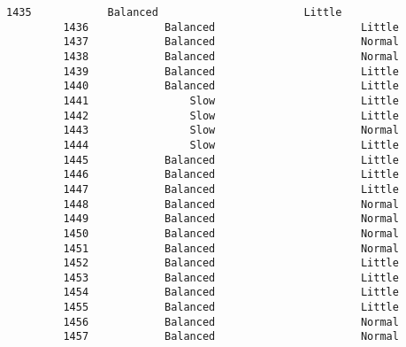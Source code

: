 \documentclass[11pt]{article}
\begin{document}
\begin{Verbatim}[commandchars=\\\{\}]
         1435            Balanced                       Little   
         1436            Balanced                       Little   
         1437            Balanced                       Normal   
         1438            Balanced                       Normal   
         1439            Balanced                       Little   
         1440            Balanced                       Little   
         1441                Slow                       Little   
         1442                Slow                       Little   
         1443                Slow                       Normal   
         1444                Slow                       Little   
         1445            Balanced                       Little   
         1446            Balanced                       Little   
         1447            Balanced                       Little   
         1448            Balanced                       Normal   
         1449            Balanced                       Normal   
         1450            Balanced                       Normal   
         1451            Balanced                       Normal   
         1452            Balanced                       Little   
         1453            Balanced                       Little   
         1454            Balanced                       Little   
         1455            Balanced                       Little   
         1456            Balanced                       Normal   
         1457            Balanced                       Normal   
         

\end{Verbatim}
\end{document}
